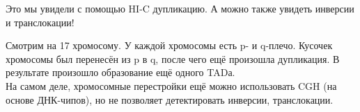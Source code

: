 \documentclass[main.tex]{subfiles}
\begin{document}
Это мы увидели с помощью HI-C дупликацию.
А можно также увидеть инверсии и транслокации!


Смотрим на 17 хромосому.
У каждой хромосомы есть p- и q-плечо.
Кусочек хромосомы был перенесён из  p в q, после чего ещё произошла дупликация.
В результате произошло образование ещё одного TADа. \\

На самом деле, хромосомные перестройки ещё можно использовать CGH (на основе ДНК-чипов), но не позволяет детектировать инверсии, транслокации.
\end{document}
